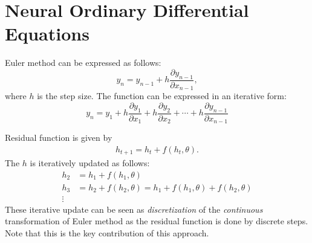 \section{Neural Ordinary Differential Equations}
\label{sec:neural_ode}
Euler method can be expressed as follows: 
$$y_n = y_{n-1}+h\frac{\partial y_{n-1}}{\partial x_{n-1}},$$
where $h$ is the step size. The function can be expressed in an iterative form:
$$y_n = y_{1}+h\frac{\partial y_{1}}{\partial x_{1}}+h\frac{\partial y_{2}}{\partial x_{2}}+\cdots+h\frac{\partial y_{n-1}}{\partial x_{n-1}}$$

Residual function is given by
\begin{align*}
	h_{t+1} = h_{t}+f(h_{t}, \theta).
\end{align*}
The $h$ is iteratively updated as follows:
\begin{align*}
	h_{2} &= h_{1}+f(h_{1}, \theta)\\
	h_{3} &= h_{2}+f(h_{2}, \theta) = h_{1}+f(h_{1}, \theta)+f(h_{2}, \theta)\\
	\vdots
\end{align*}
These iterative update can be seen as \textit{discretization} of the \textit{continuous} transformation of Euler method as the residual function is done by discrete steps. Note that this is the key contribution of this approach.   

